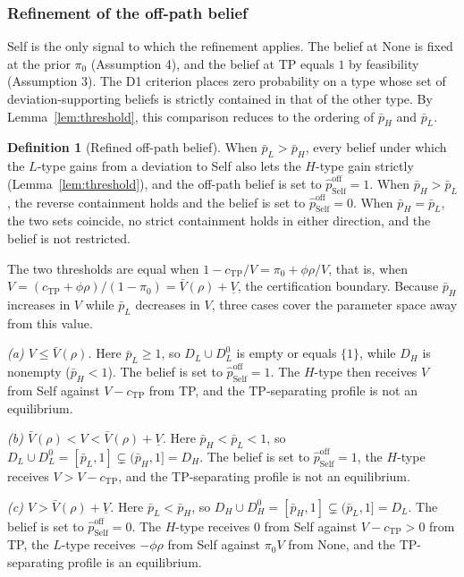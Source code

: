 \documentclass[11pt,letterpaper]{article}
\theoremstyle{definition}
\newtheorem{definition}{Definition}[section]
\begin{document}
\subsubsection*{Refinement of the off-path belief}

Self is the only signal to which the refinement applies. The belief at None is fixed at the prior $\pi_0$ (Assumption 4), and the belief at TP equals $1$ by feasibility (Assumption 3). The D1 criterion places zero probability on a type whose set of deviation-supporting beliefs is strictly contained in that of the other type. By Lemma~\ref{lem:threshold}, this comparison reduces to the ordering of $\bar{p}_H$ and $\bar{p}_L$.

\begin{definition}[Refined off-path belief]\label{def:d1-belief}
When $\bar{p}_L > \bar{p}_H$, every belief under which the $L$-type gains from a deviation to Self also lets the $H$-type gain strictly (Lemma~\ref{lem:threshold}), and the off-path belief is set to $\hat{p}_{\text{Self}}^{\text{off}} = 1$. When $\bar{p}_H > \bar{p}_L$, the reverse containment holds and the belief is set to $\hat{p}_{\text{Self}}^{\text{off}} = 0$. When $\bar{p}_H = \bar{p}_L$, the two sets coincide, no strict containment holds in either direction, and the belief is not restricted.
\end{definition}

The two thresholds are equal when $1 - c_{\text{TP}}/V = \pi_0 + \phi\rho/V$, that is, when $V = (c_{\text{TP}} + \phi\rho)/(1 - \pi_0) = \bar{V}(\rho) + \underline{V}$, the certification boundary. Because $\bar{p}_H$ increases in $V$ while $\bar{p}_L$ decreases in $V$, three cases cover the parameter space away from this value.

\textit{(a) $V \leq \bar{V}(\rho)$.} Here $\bar{p}_L \geq 1$, so $D_L \cup D^0_L$ is empty or equals $\{1\}$, while $D_H$ is nonempty ($\bar{p}_H < 1$). The belief is set to $\hat{p}_{\text{Self}}^{\text{off}} = 1$. The $H$-type then receives $V$ from Self against $V - c_{\text{TP}}$ from TP, and the TP-separating profile is not an equilibrium.

\textit{(b) $\bar{V}(\rho) < V < \bar{V}(\rho) + \underline{V}$.} Here $\bar{p}_H < \bar{p}_L < 1$, so $D_L \cup D^0_L = [\bar{p}_L, 1] \subsetneq (\bar{p}_H, 1] = D_H$. The belief is set to $\hat{p}_{\text{Self}}^{\text{off}} = 1$, the $H$-type receives $V > V - c_{\text{TP}}$, and the TP-separating profile is not an equilibrium.

\textit{(c) $V > \bar{V}(\rho) + \underline{V}$.} Here $\bar{p}_L < \bar{p}_H$, so $D_H \cup D^0_H = [\bar{p}_H, 1] \subsetneq (\bar{p}_L, 1] = D_L$. The belief is set to $\hat{p}_{\text{Self}}^{\text{off}} = 0$. The $H$-type receives $0$ from Self against $V - c_{\text{TP}} > 0$ from TP, the $L$-type receives $-\phi\rho$ from Self against $\pi_0 V$ from None, and the TP-separating profile is an equilibrium.
\end{document}
